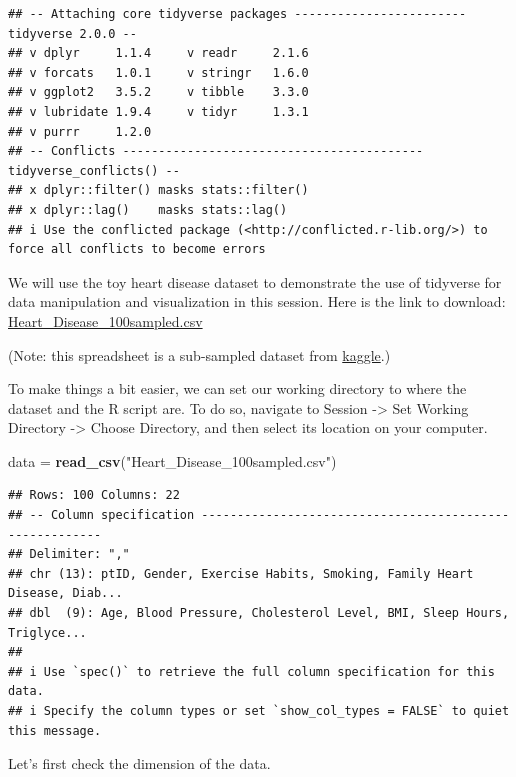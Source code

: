\documentclass[
]{article}
\newenvironment{Shaded}{\begin{snugshade}}{\end{snugshade}}
\newcommand{\FunctionTok}[1]{\textcolor[rgb]{0.13,0.29,0.53}{\textbf{#1}}}
\newcommand{\NormalTok}[1]{#1}
\newcommand{\OtherTok}[1]{\textcolor[rgb]{0.56,0.35,0.01}{#1}}
\newcommand{\StringTok}[1]{\textcolor[rgb]{0.31,0.60,0.02}{#1}}
\begin{document}
\begin{verbatim}
## -- Attaching core tidyverse packages ------------------------ tidyverse 2.0.0 --
## v dplyr     1.1.4     v readr     2.1.6
## v forcats   1.0.1     v stringr   1.6.0
## v ggplot2   3.5.2     v tibble    3.3.0
## v lubridate 1.9.4     v tidyr     1.3.1
## v purrr     1.2.0     
## -- Conflicts ------------------------------------------ tidyverse_conflicts() --
## x dplyr::filter() masks stats::filter()
## x dplyr::lag()    masks stats::lag()
## i Use the conflicted package (<http://conflicted.r-lib.org/>) to force all conflicts to become errors
\end{verbatim}

We will use the toy heart disease dataset to demonstrate the use of
tidyverse for data manipulation and visualization in this session. Here
is the link to download:
\href{https://github.com/Ma-Lab-Seattle-Childrens-CGIDR/SEATRAC_Rintro/blob/main/Heart_Disease_100sampled.csv}{Heart\_Disease\_100sampled.csv}

(Note: this spreadsheet is a sub-sampled dataset from
\href{https://www.kaggle.com/datasets/oktayrdeki/heart-disease/data}{kaggle}.)

To make things a bit easier, we can set our working directory to where
the dataset and the R script are. To do so, navigate to Session
-\textgreater{} Set Working Directory -\textgreater{} Choose Directory,
and then select its location on your computer.

\begin{Shaded}
\begin{Highlighting}[]
\NormalTok{data }\OtherTok{=} \FunctionTok{read\_csv}\NormalTok{(}\StringTok{"Heart\_Disease\_100sampled.csv"}\NormalTok{)}
\end{Highlighting}
\end{Shaded}

\begin{verbatim}
## Rows: 100 Columns: 22
## -- Column specification --------------------------------------------------------
## Delimiter: ","
## chr (13): ptID, Gender, Exercise Habits, Smoking, Family Heart Disease, Diab...
## dbl  (9): Age, Blood Pressure, Cholesterol Level, BMI, Sleep Hours, Triglyce...
## 
## i Use `spec()` to retrieve the full column specification for this data.
## i Specify the column types or set `show_col_types = FALSE` to quiet this message.
\end{verbatim}

Let's first check the dimension of the data.
\end{document}
